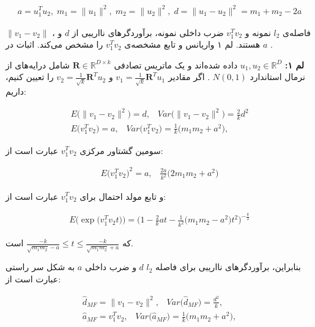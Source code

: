 \begin{align}
a= u_1^T u_2, \; m_1 = \|u_1 \|^2, \; m_2 = \| u_2 \|^2, \; d =  \| u_1 - u_2 \|^2 = m_1 + m_2 - 2a
\label{eq:1i7}
\end{align}


$\| v_1 - v_2 \|$
، فاصله‌ی 
$l_2$
نمونه و 
$v_1^T v_2$
ضرب داخلی نمونه، برآوردگرهای نااریبی از 
$d$
و 
$a$
هستند. لم ۱ واریانس و تابع مشخصه‌ی 
$v_1^T v_2$
را مشخص می‌‌کند. اثبات در 
\cite{li2007stable}
.

\textbf{لم ۱:}
$u_1, u_2 \in \mathbb{R}^D$
داده شده‌اند و یک ماتریس تصادفی
$\mathbf{R} \in \mathbb{R}^{D \times k}$
شامل درایه‌های 
از نرمال استاندارد
$N(0,1)$
. اگر مقادیر 
$v_1 = \frac{1}{\sqrt{k}} \mathbf{R}^T u_1$
و 
$v_2 = \frac{1}{\sqrt{k}} \mathbf{R}^T u_2$
را تعیین کنیم، داریم:

\begin{align}
E \big(  \| v_1 - v_2 \|^2 \big) = d, \;\;\; \mathit{Var}\big(\| v_1 - v_2 \|^2\big) = \frac{2}{k} d^2  \label{eq:1i8}\\
E \big( v_1^T v_2 \big) = a, \;\;\; \mathit{Var} \big(v_1^T v_2 \big) =  \frac{1}{k} \big(m_1 m_2 + a^2\big), \label{eq:1i9}
\end{align}

سومین گشتاور مرکزی 
$v_1^T v_2$
عبارت است از:

\begin{align}
E \big( v_1^T v_2 \big)^2 = a, \;\;\; \frac{2a}{k^2} \big( 2 m_1 m_2 + a^2 \big)
\label{eq:1iA}
\end{align}

و تابع مولد احتمال برای 
$v_1^T v_2$
عبارت است از:

\begin{align}
E \big( \exp \big( v_1^T v_2 t \big) \big)
 = \bigg(  1 - \frac{2}{k} at - \frac{1}{k^2} \big( m_1 m_2 - a^2 \big) t^2 \bigg)^{- \frac{k}{2}}
\label{eq:1iB}
\end{align}

که 
$\frac{-k}{\sqrt{m_1 m_2} - a} \leq t \leq \frac{-k}{\sqrt{m_1 m_2} + a}$
است.

بنابراین، برآوردگرهای نااریبی برای فاصله 
$l_2$
$d$
و ضرب داخلی
$a$
به شکل سر راستی عبارت است از:

\begin{align}
\hat{d}_{MF} = \| v_1 - v_2 \|^2, \;\;\; \mathit{Var} \Big( \hat{d}_{MF} \Big) = \frac{d^2}{k}, \label{eq:1iC}\\
\hat{a}_{MF} = v_1^T v_2, \;\;\; \mathit{Var} \big( \hat{a}_{MF} \big) = \frac{1}{k} \big( m_1 m_2 + a^2 \big), \label{eq:1iD}
\end{align}

